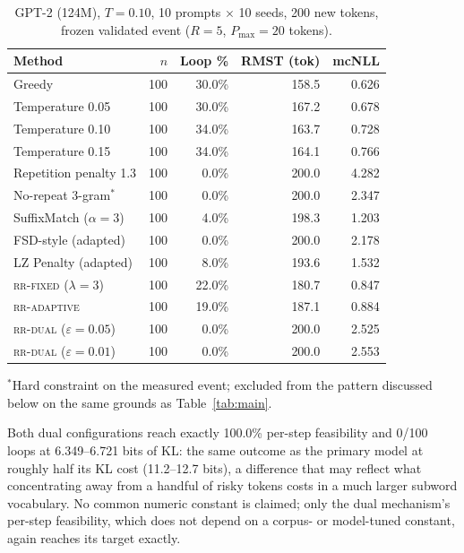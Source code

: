 \documentclass[11pt]{article}
\begin{document}
\begin{table}[ht]
\centering
\caption{GPT-2 (124M), $T{=}0.10$, 10 prompts $\times$ 10 seeds, 200 new tokens, frozen validated event ($R{=}5$, $P_{\max}{=}20$ tokens).}
\label{tab:gpt2full}
\begin{tabular}{@{}lrrrr@{}}
\toprule
Method & $n$ & Loop \% & RMST (tok) & mcNLL \\
\midrule
Greedy                      & 100 & 30.0\% & 158.5 & 0.626 \\
Temperature 0.05             & 100 & 30.0\% & 167.2 & 0.678 \\
Temperature 0.10             & 100 & 34.0\% & 163.7 & 0.728 \\
Temperature 0.15             & 100 & 34.0\% & 164.1 & 0.766 \\
Repetition penalty 1.3        & 100 & 0.0\%  & 200.0 & 4.282 \\
No-repeat 3-gram$^{*}$       & 100 & 0.0\%  & 200.0 & 2.347 \\
SuffixMatch ($\alpha{=}3$)    & 100 & 4.0\%  & 198.3 & 1.203 \\
FSD-style (adapted)          & 100 & 0.0\%  & 200.0 & 2.178 \\
LZ Penalty (adapted)        & 100 & 8.0\%  & 193.6 & 1.532 \\
\textsc{rr-fixed} ($\lambda{=}3$)   & 100 & 22.0\% & 180.7 & 0.847 \\
\textsc{rr-adaptive}          & 100 & 19.0\% & 187.1 & 0.884 \\
\textsc{rr-dual} ($\varepsilon{=}0.05$) & 100 & 0.0\% & 200.0 & 2.525 \\
\textsc{rr-dual} ($\varepsilon{=}0.01$) & 100 & 0.0\% & 200.0 & 2.553 \\
\bottomrule
\end{tabular}

\vspace{4pt}
{\footnotesize $^{*}$Hard constraint on the measured event; excluded from the pattern discussed below on the same grounds as Table~\ref{tab:main}.}
\end{table}

Both dual configurations reach exactly 100.0\% per-step feasibility and 0/100 loops at 6.349--6.721 bits of KL: the same outcome as the primary model at roughly half its KL cost (11.2--12.7 bits), a difference that may reflect what concentrating away from a handful of risky tokens costs in a much larger subword vocabulary. No common numeric constant is claimed; only the dual mechanism's per-step feasibility, which does not depend on a corpus- or model-tuned constant, again reaches its target exactly.
\end{document}
